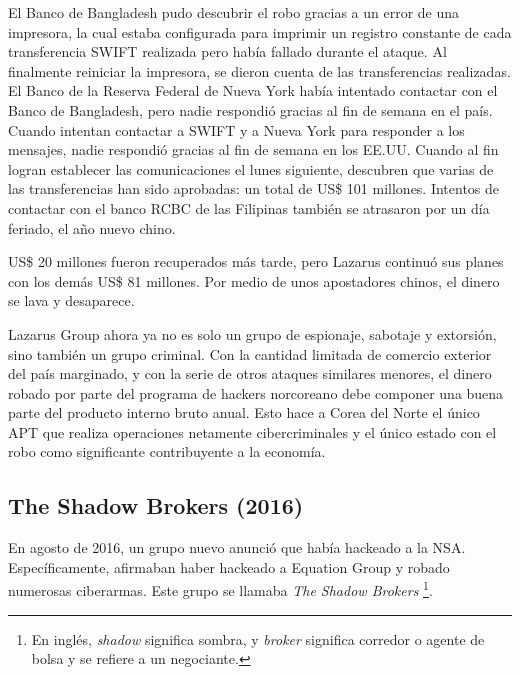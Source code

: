 \documentclass{article}
\begin{document}
El Banco de Bangladesh pudo descubrir el robo gracias a un error de una impresora, la cual estaba configurada para imprimir un registro constante de cada transferencia SWIFT realizada pero había fallado durante el ataque. Al finalmente reiniciar la impresora, se dieron cuenta de las transferencias realizadas. El Banco de la Reserva Federal de Nueva York había intentado contactar con el Banco de Bangladesh, pero nadie respondió gracias al fin de semana en el país. Cuando intentan contactar a SWIFT y a Nueva York para responder a los mensajes, nadie respondió gracias al fin de semana en los EE.UU. Cuando al fin logran establecer las comunicaciones el lunes siguiente, descubren que varias de las transferencias han sido aprobadas: un total de US\$ 101 millones. Intentos de contactar con el banco RCBC de las Filipinas también se atrasaron por un día feriado, el año nuevo chino. \autocite{wired-bangladesh} \autocite{nypost-bangladesh}

US\$ 20 millones fueron recuperados más tarde, pero Lazarus continuó sus planes con los demás US\$ 81 millones. Por medio de unos apostadores chinos, el dinero se lava y desaparece. \autocite{bloomberg-bangladesh}

Lazarus Group ahora ya no es solo un grupo de espionaje, sabotaje y extorsión, sino también un grupo criminal. Con la cantidad limitada de comercio exterior del país marginado, y con la serie de otros ataques similares menores, el dinero robado por parte del programa de hackers norcoreano debe componer una buena parte del producto interno bruto anual. Esto hace a Corea del Norte el único APT que realiza operaciones netamente cibercriminales y el único estado con el robo como significante contribuyente a la economía.


\subsection{The Shadow Brokers (2016)}
En agosto de 2016, un grupo nuevo anunció que había hackeado a la NSA. Específicamente, afirmaban haber hackeado a Equation Group y robado numerosas ciberarmas. Este grupo se llamaba {\it The Shadow Brokers} \footnote{En inglés, {\it shadow} significa sombra, y {\it broker} significa corredor o agente de bolsa y se refiere a un negociante.}.
\end{document}
